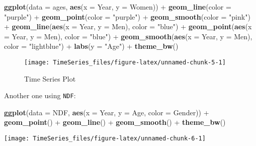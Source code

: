 \documentclass[]{article}
\newenvironment{Shaded}{\begin{snugshade}}{\end{snugshade}}
\newcommand{\KeywordTok}[1]{\textcolor[rgb]{0.13,0.29,0.53}{\textbf{{#1}}}}
\newcommand{\DataTypeTok}[1]{\textcolor[rgb]{0.13,0.29,0.53}{{#1}}}
\newcommand{\StringTok}[1]{\textcolor[rgb]{0.31,0.60,0.02}{{#1}}}
\newcommand{\NormalTok}[1]{{#1}}
\begin{document}
\begin{Shaded}
\begin{Highlighting}[]
\KeywordTok{ggplot}\NormalTok{(}\DataTypeTok{data =} \NormalTok{ages, }\KeywordTok{aes}\NormalTok{(}\DataTypeTok{x =} \NormalTok{Year, }\DataTypeTok{y =} \NormalTok{Women)) +}\StringTok{ }
\StringTok{  }\KeywordTok{geom_line}\NormalTok{(}\DataTypeTok{color =} \StringTok{"purple"}\NormalTok{) +}\StringTok{ }
\StringTok{  }\KeywordTok{geom_point}\NormalTok{(}\DataTypeTok{color =} \StringTok{"purple"}\NormalTok{) +}\StringTok{ }
\StringTok{  }\KeywordTok{geom_smooth}\NormalTok{(}\DataTypeTok{color =} \StringTok{"pink"}\NormalTok{) +}\StringTok{ }
\StringTok{  }\KeywordTok{geom_line}\NormalTok{(}\KeywordTok{aes}\NormalTok{(}\DataTypeTok{x =} \NormalTok{Year, }\DataTypeTok{y =} \NormalTok{Men), }\DataTypeTok{color =} \StringTok{"blue"}\NormalTok{) +}\StringTok{ }
\StringTok{  }\KeywordTok{geom_point}\NormalTok{(}\KeywordTok{aes}\NormalTok{(}\DataTypeTok{x =} \NormalTok{Year, }\DataTypeTok{y =} \NormalTok{Men), }\DataTypeTok{color =} \StringTok{"blue"}\NormalTok{) +}\StringTok{ }
\StringTok{  }\KeywordTok{geom_smooth}\NormalTok{(}\KeywordTok{aes}\NormalTok{(}\DataTypeTok{x =} \NormalTok{Year, }\DataTypeTok{y =} \NormalTok{Men), }\DataTypeTok{color =} \StringTok{"lightblue"}\NormalTok{) +}
\StringTok{  }\KeywordTok{labs}\NormalTok{(}\DataTypeTok{y =} \StringTok{"Age"}\NormalTok{) +}
\StringTok{  }\KeywordTok{theme_bw}\NormalTok{()}
\end{Highlighting}
\end{Shaded}

\begin{figure}

{\centering \texttt{[image: TimeSeries\_files/figure-latex/unnamed-chunk-5-1]} 

}

\caption{Time Series Plot}\label{fig:unnamed-chunk-5}
\end{figure}

Another one using \texttt{NDF}:

\begin{Shaded}
\begin{Highlighting}[]
\KeywordTok{ggplot}\NormalTok{(}\DataTypeTok{data =} \NormalTok{NDF, }\KeywordTok{aes}\NormalTok{(}\DataTypeTok{x =} \NormalTok{Year, }\DataTypeTok{y =} \NormalTok{Age, }\DataTypeTok{color =} \NormalTok{Gender)) +}\StringTok{ }
\StringTok{  }\KeywordTok{geom_point}\NormalTok{() +}\StringTok{ }
\StringTok{  }\KeywordTok{geom_line}\NormalTok{() +}
\StringTok{  }\KeywordTok{geom_smooth}\NormalTok{() +}
\StringTok{  }\KeywordTok{theme_bw}\NormalTok{() }
\end{Highlighting}
\end{Shaded}

\begin{center}\texttt{[image: TimeSeries\_files/figure-latex/unnamed-chunk-6-1]} \end{center}
\end{document}
